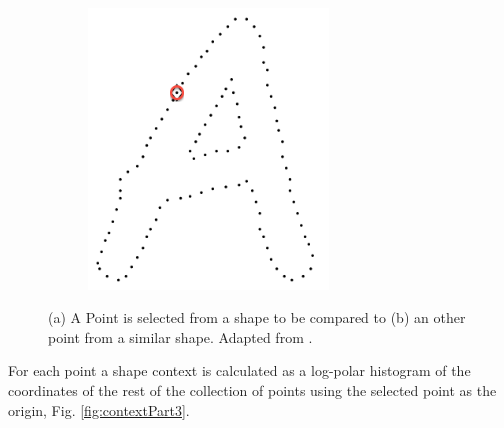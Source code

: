 \begin{figure}[h]
\begin{subfigure}[b]{0.36\textwidth}
                \includegraphics[width=0.7\textwidth]{figures/LitreatureReview/letterb.png}
                \caption{}
                \label{fig:lettB}
        \end{subfigure}
        \caption[Choice of points from two similar shapes for calculation of shape context]{(a) A Point is selected from a shape to be compared to (b) an other point from a similar shape. Adapted from \cite{context}.}
        \label{fig:contextPart2}
\end{figure}

For each point a shape context is calculated as a log-polar histogram of the coordinates of the rest of the collection of points using the selected point as the origin, Fig. \ref{fig:contextPart3}.\\

